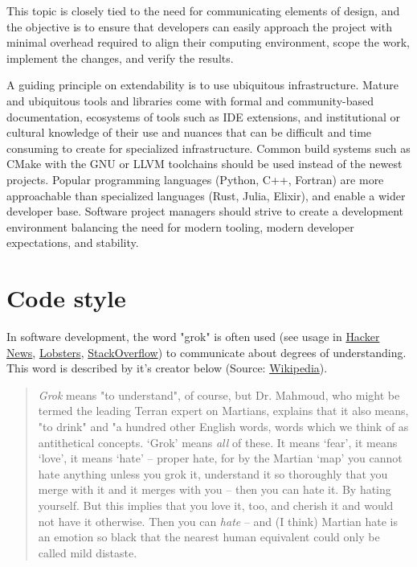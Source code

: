 \documentclass[]{nrel}
\begin{document}
This topic is closely tied to the need for communicating elements of design, and the objective is to ensure that
developers can easily approach the project with minimal overhead required to align their
computing environment, scope the work, implement the changes, and verify the results.

A guiding principle on extendability is to use ubiquitous infrastructure.
Mature and ubiquitous tools and libraries come with formal and community-based documentation,
ecosystems of tools such as IDE extensions, and institutional or cultural knowledge of
their use and nuances that can be difficult and time consuming to create for specialized
infrastructure.
Common build systems such as CMake with the GNU or LLVM toolchains should be used instead of
the newest projects.
Popular programming languages (Python, C++, Fortran) are more approachable than specialized
languages (Rust, Julia, Elixir), and enable a wider developer base.
Software project managers should strive to create a development environment balancing the need for
modern tooling, modern developer expectations, and stability.

\section{Code style}
In software development, the word "grok" is often used (see usage in
\href{https://hn.algolia.com/?q=grok}{Hacker News},
\href{https://lobste.rs/search?q=grok\&what=stories\&order=newest}{Lobsters},
\href{https://stackoverflow.com/search?tab=newest\&q=grok\&searchOn=3}{StackOverflow})
to communicate about degrees of understanding. This word is described by it’s creator below
(Source: \href{https://en.wikipedia.org/wiki/Grok}{Wikipedia}).
\begin{quote}

\textit{Grok} means "to understand", of course, but Dr. Mahmoud, who might be termed the leading
Terran expert on Martians, explains that it also means, "to drink" and "a hundred other
English words, words which we think of as antithetical concepts. ‘Grok’ means \textit{all} of
these. It means ‘fear’, it means ‘love’, it means ‘hate’ – proper hate, for by the Martian
‘map’ you cannot hate anything unless you grok it, understand it so thoroughly that you
merge with it and it merges with you – then you can hate it. By hating yourself. But this
implies that you love it, too, and cherish it and would not have it otherwise. Then you
can \textit{hate} – and (I think) Martian hate is an emotion so black that the nearest human
equivalent could only be called mild distaste.
\end{quote}
\end{document}
